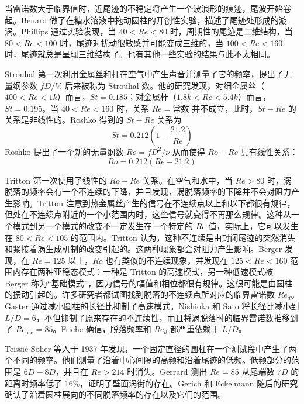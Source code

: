 当雷诺数大于临界值时，近尾迹的不稳定将产生一个波浪形的痕迹，尾波开始卷起。Bénard 做了在糖水溶液中拖动圆柱的开创性实验，描述了尾迹处形成的漩涡。Phillips 通过实验发现，当 $40<Re<80$ 时，周期性的尾迹是二维结构，当 $80<Re<100$ 时，尾迹对扰动很敏感并可能变成三维的，当 $100<Re<160$ 时，尾迹就总是呈现三维结构了。也有其他一些实验的结果与此不太相同。


Strouhal 第一次利用金属丝和杆在空气中产生声音并测量了它的频率，提出了无量纲参数 $fD/V$, 后来被称为 Strouhal 数。他的研究发现，对细金属丝（$400<Re<1k$）而言，$St=0.185$；对金属杆（$1.8k<Re<5.4k$）而言，$St=0.195$。当 $40<Re<160$ 时，关系 $Re=\text{常数}$ 并不成立，此时，$St-Re$ 的关系是非线性的。Roshko \cite{Roshko1953} 得到的 $St-Re$ 关系为
\begin{equation}
	St = 0.212 (1-\frac{21.2}{Re})
\end{equation}
Roshko \cite{Roshko1953} 提出了一个新的无量纲数 $Ro=fD^2/\nu$ 从而使得 $Ro-Re$ 具有线性关系：
\begin{equation}
	Ro = 0.212 (Re - 21.2)
\end{equation}

Tritton 第一次使用了线性的 $Ro-Re$ 关系。在空气和水中，当 $Re>80$ 时，涡脱落的频率会有一个不连续的下降，并且发现，涡脱落频率的下降并不会对阻力产生影响。Tritton 注意到热金属丝产生的信号在不连续点以上和以下都很有规律，但处在不连续点附近的一个小范围内时，这些信号就变得不再那么规律。这种从一个模式到另一个模式的改变不一定发生在一个特定的 $Re$ 值，实际上，它可以发生在 $80<Re<105$ 的范围内。Tritton 认为，这种不连续是由封闭尾迹的突然消失和紧接着涡生成机制的改变引起的。这两种现象都会对阻力产生影响。Berger 发现，在 $Re=125$ 以上，$Ro$ 也有类似的不连续现象，并发现在 $125<Re<160$ 范围内存在两种亚稳态模式：一种是 Tritton 的高速模式，另一种低速模式被 Berger 称为“基础模式”，因为信号的幅值和相位都很有规律。这很可能是由圆柱的振动引起的。许多研究者都试图找到脱落的不连续点所对应的临界雷诺数 $Re_d$。Gaster 通过减小圆柱的长径比抑制了高速模式。Nishioka 和 Sato 将长径比减小到 $L/D=6$，不但抑制了原来存在的不连续性，而且将涡脱落时的临界雷诺数推移到了 $Re_\text{osc}=85$。Friehe 确信，脱落频率和 $Re_d$ 都严重依赖于 $L/D$。

Teissié-Solier 等人于 1937 年发现，一个固定直径的圆柱在一个测试段中产生了两个不同的频率。他们测量了沿着中心间隔的高频和沿着尾迹的低频。低频部分的范围是 $6D-8D$，并且在 $Re>214$ 时消失。Gerrard 测出 $Re=85$ 从尾端数 $7D$ 的距离时频率低了 16\%，证明了壁面涡街的存在。Gerich 和 Eckelmann 随后的研究确认了沿着圆柱展向的不同脱落频率的存在以及它们的范围。%

